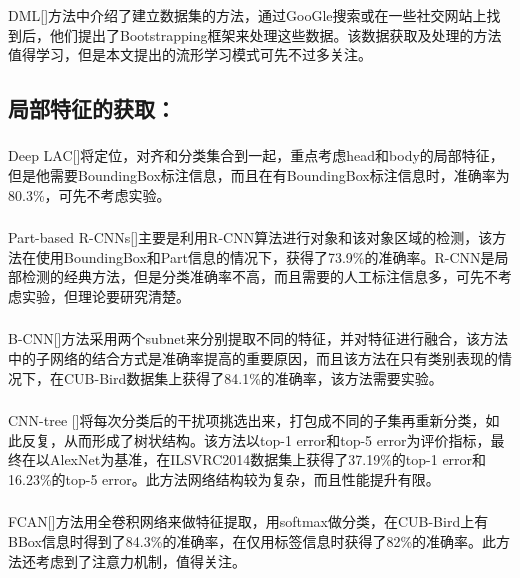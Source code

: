 \documentclass[UTF8]{article}
\begin{document}
\subsubsection{{\color{red}{Deep Metric Learning}}}
DML\cite{DML}[{\color{GREY}{弱监督 }}]方法中介绍了建立数据集的方法，通过GooGle搜索或在一些社交网站上找到后，他们提出了Bootstrapping框架来处理这些数据。该数据获取及处理的方法值得学习，但是本文提出的流形学习模式可先不过多关注。
\subsection{局部特征的获取：}
\subsubsection{{\color{red}{Deep LAC }}}
Deep LAC\cite{deeplac}[{\color{GREY}{强监督 }}]将定位，对齐和分类集合到一起，重点考虑head和body的局部特征，但是他需要BoundingBox标注信息，而且在有BoundingBox标注信息时，准确率为80.3\%，可先不考虑实验。
\subsubsection{{\color{red}{partRCNN}}}
Part-based R-CNNs\cite{partrcnn}[{\color{GREY}{强监督 }}]主要是利用R-CNN算法进行对象和该对象区域的检测，该方法在使用BoundingBox和Part信息的情况下，获得了73.9\%的准确率。R-CNN是局部检测的经典方法，但是分类准确率不高，而且需要的人工标注信息多，可先不考虑实验，但理论要研究清楚。
\subsubsection{{\color{GREEN}{B-CNN}}}
B-CNN\cite{BCNN}[{\color{GREY}{弱监督 }}]方法采用两个subnet来分别提取不同的特征，并对特征进行融合，该方法中的子网络的结合方式是准确率提高的重要原因，而且该方法在只有类别表现的情况下，在CUB-Bird数据集上获得了84.1\%的准确率，该方法需要实验。
\subsubsection{{\color{BLUE}{CNN-tree}}}
CNN-tree\cite{cnntree} [{\color{GREY}{弱监督 }}]将每次分类后的干扰项挑选出来，打包成不同的子集再重新分类，如此反复，从而形成了树状结构。该方法以top-1 error和top-5 error为评价指标，最终在以AlexNet为基准，在ILSVRC2014数据集上获得了37.19\%的top-1 error和16.23\%的top-5 error。此方法网络结构较为复杂，而且性能提升有限。
\subsubsection{{\color{GREEN}{FCAN}}}
FCAN\cite{FCAN}[{\color{GREY}{弱监督 }}]方法用全卷积网络来做特征提取，用softmax做分类，在CUB-Bird上有BBox信息时得到了84.3\%的准确率，在仅用标签信息时获得了82\%的准确率。此方法还考虑到了注意力机制，值得关注。
\end{document}
